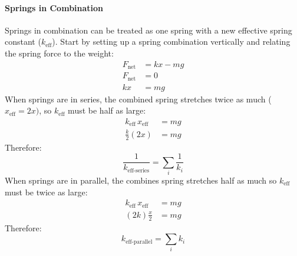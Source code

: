 \documentclass{article}
\begin{document}
            \paragraph{Springs in Combination}
            Springs in combination can be treated as one spring with a new effective spring constant ($k_\text{eff}$). Start by setting up a spring combination vertically and relating the spring force to the weight:
            \begin{align}
                F_\text{net} &= k x - m g \nonumber\\
                F_\text{net} &= 0 \nonumber\\
                k x &= m g \nonumber
            \end{align}
            When springs are in series, the combined spring stretches twice as much ($x_\text{eff} = 2x)$, so $k_\text{eff}$ must be half as large:
            \begin{align}
                k_\text{eff} \, x_\text{eff} &= m g \nonumber\\
                \frac{k}{2} \left(2 x \right) &= m g \nonumber
            \end{align}
            Therefore:
            \begin{equation}
                \frac{1}{k_\text{eff-series}} = \sum_i \frac{1}{k_i}
            \end{equation}
            When springs are in parallel, the combines spring stretches half as much so $k_\text{eff}$ must be twice as large:
            \begin{align}
                k_\text{eff} \, x_\text{eff} &= m g \nonumber\\
                \left(2 k \right) \frac{x}{2} &= m g \nonumber
            \end{align}
            Therefore:
            \begin{equation}
                k_\text{eff-parallel} = \sum_i k_i
            \end{equation}
\end{document}
